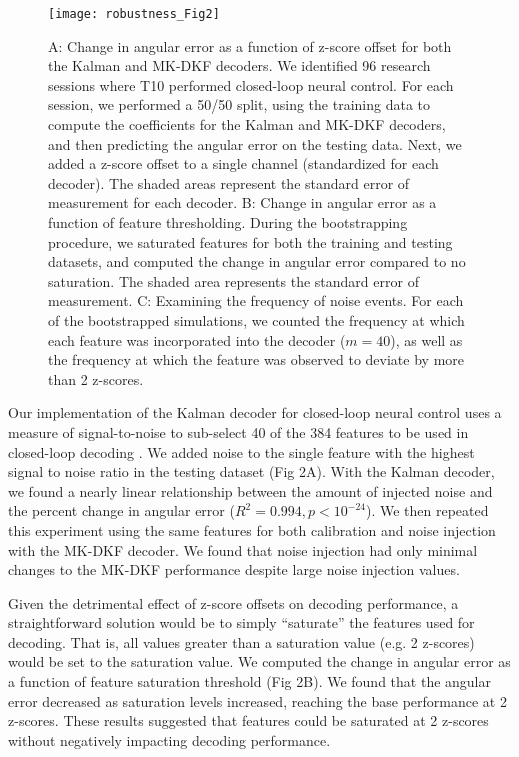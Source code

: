 \begin{figure}[h]
\centering
\texttt{[image: robustness\_Fig2]}
\caption[Offline performance comparison of nonstationary noise injection on Kalman and MK-DKF decoders]{A: Change in angular error as a function of z-score offset for both the Kalman and MK-DKF decoders. We identified 96 research sessions where T10 performed closed-loop neural control. For each session, we performed a 50/50 split, using the training data to compute the coefficients for the Kalman and MK-DKF decoders, and then predicting the angular error on the testing data. Next, we added a z-score offset to a single channel (standardized for each decoder). The shaded areas represent the standard error of measurement for each decoder. B: Change in angular error as a function of feature thresholding. During the bootstrapping procedure, we saturated features for both the training and testing datasets, and computed the change in angular error compared to no saturation. The shaded area represents the standard error of measurement. C: Examining the frequency of noise events. For each of the bootstrapped simulations, we counted the frequency at which each feature was incorporated into the decoder ($m = 40$), as well as the frequency at which the feature was observed to deviate by more than 2 z-scores.}
\label{fig:Fig2}
\end{figure}

Our implementation of the Kalman decoder for closed-loop neural control \cite{Jarosiewicz2015, Bacher2015, Brandman2018} uses a measure of signal-to-noise to sub-select 40 of the 384 features to be used in closed-loop decoding \cite{Malik2015}. We added noise to the single feature with the highest signal to noise ratio in the testing dataset (Fig 2A). With the Kalman decoder, we found a nearly linear relationship between the amount of injected noise and the percent change in angular error ($R^2 = 0.994, p < 10^{-24}$). We then repeated this experiment using the same features for both calibration and noise injection with the MK-DKF decoder. We found that noise injection had only minimal changes to the MK-DKF performance despite large noise injection values. 

Given the detrimental effect of z-score offsets on decoding performance, a straightforward solution would be to simply ``saturate'' the features used for decoding. That is, all values greater than a saturation value (e.g. 2 z-scores) would be set to the saturation value. We computed the change in angular error as a function of feature saturation threshold (Fig 2B). We found that the angular error decreased as saturation levels increased, reaching the base performance at 2 z-scores. These results suggested that features could be saturated at 2 z-scores without negatively impacting decoding performance. 

